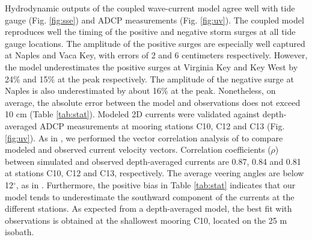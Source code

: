 Hydrodynamic outputs of the coupled wave-current model agree well with tide gauge (Fig. \ref{fig:sse}) and ADCP measurements (Fig. \ref{fig:uv}). The coupled model reproduces well the timing of the positive and negative storm surges at all tide gauge locations. The amplitude of the positive surges are especially well captured at Naples and Vaca Key, with errors of 2 and 6 centimeters respectively. However, the model underestimates the positive surges at Virginia Key and Key West by 24\% and 15\% at the peak respectively. The amplitude of the negative surge at Naples is also underestimated by about 16\% at the peak. Nonetheless, on average, the absolute error between the model and observations does not exceed 10 cm (Table \ref{tab:stat}). Modeled 2D currents were validated against depth-averaged ADCP measurements at mooring stations C10, C12 and C13 (Fig. \ref{fig:uv}). As in \cite{liu2020impacts}, we performed the vector correlation analysis of \cite{kundu1976ekman} to compare modeled and observed current velocity vectors. Correlation coefficients ($\rho$) between simulated and observed depth-averaged currents are 0.87, 0.84 and 0.81 at stations C10, C12 and C13, respectively. The average veering angles are below 12$^\circ$, as in \citep{liu2020impacts}. Furthermore, the positive bias in Table \ref{tab:stat} indicates that our model tends to underestimate the southward component of the currents at the different stations. As expected from a depth-averaged model, the best fit with observations is obtained at the shallowest mooring C10, located on the 25 m isobath. 

